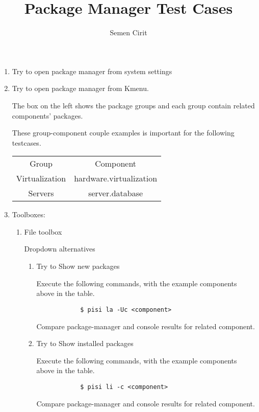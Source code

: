 \documentclass[a4paper,10pt]{article}
\title{Package Manager Test Cases}
\author{Semen Cirit}
\begin{document}
\maketitle

\begin{enumerate}
    \item Try to open package manager from system settings
    \item Try to open package manager from Kmenu.
    

    The box on the left shows the package groups and each group contain related components' packages.

    These group-component couple examples is important for the following testcases.
      \begin{table}[h]
 	  \centering
 	  \begin{tabular}{|c|c|}
 		  \hline
 		  Group & Component \\
 		  Virtualization & hardware.virtualization \\
 		  Servers & server.database \\
 		  \hline
 	  \end{tabular} 
 	  \label{tab:tbl}
     \end{table}
  
   \item Toolboxes:
    \begin{enumerate}
        \item File toolbox
    
        Dropdown alternatives
        \begin{enumerate}
            \item Try to Show new packages
            
            Execute the following commands, with the example components above in the table.
            \begin{verbatim}
            $ pisi la -Uc <component>
            \end{verbatim}
            Compare package-manager and console results for related component.
            \item Try to Show installed packages
            
            Execute the following commands, with the example components above in the table.
            \begin{verbatim}
            $ pisi li -c <component>
            \end{verbatim}
            Compare package-manager and console results for related component.
    

\end{enumerate}
\end{enumerate}
\end{enumerate}
\end{document}
